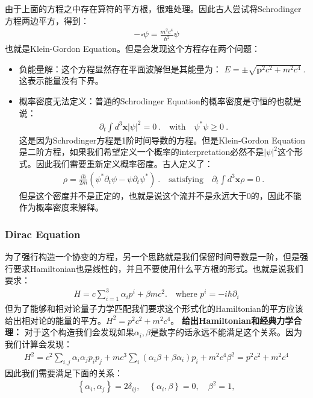 由于上面的方程之中存在算符的平方根，很难处理。因此古人尝试将Schrodinger方程两边平方，得到：
\begin{align}
  -\square\psi=\frac{m^2c^4}{\hbar^2}\psi
\end{align}
也就是Klein-Gordon Equation。但是会发现这个方程存在两个问题：
\begin{itemize}
  \item 负能量解：这个方程显然存在平面波解但是其能量为： $
    E=\pm\sqrt{\mathbf{p}^2c^2+m^2c^4}\mathrm{~.} $这表示能量没有下界。
  \item 概率密度无法定义：普通的Schrodinger Equation的概率密度是守恒的也就是说：
    \begin{align}
      \partial_{t} \int d^3\mathbf{x} |\psi|^2 = 0\mathrm{~.} \quad
      \text{with} \quad \psi^* \psi \geq 0\mathrm{~.}
    \end{align}
    这是因为Schrodinger方程是1阶时间导数的方程。但是Klein-Gordon
    Equation是二阶方程，如果我们希望定义一个概率的interpretation必然不是$ |\psi|^2
    $这个形式。因此我们需要重新定义概率密度。古人定义了：
    \begin{align}
      \rho = \frac{i\hbar}{2m}(\psi^*\partial_t\psi -
      \psi\partial_t\psi^*)\mathrm{~.} \quad \text{satisfying} \quad
      \partial_t \int d^3\mathbf{x} \rho = 0\mathrm{~.}
    \end{align}
    但是这个密度并不是正定的，也就是说这个流并不是永远大于0的，因此不能作为概率密度来解释。
\end{itemize}

\subsubsection{Dirac Equation}

\bigskip
{}

为了强行构造一个协变的方程，另一个思路就是我们保留时间导数是一阶，但是强行要求Hamiltonian也是线性的，并且不要使用什么平方根的形式。也就是说我们要求：
\begin{align}
  H=c\sum_{i=1}^3\alpha_ip^i+\beta mc^2. \quad \text{where }
  p^i=-i\hbar \partial_i
\end{align}
但为了能够和相对论量子力学匹配我们要求这个形式化的Hamiltonian的平方应该给出相对论的能量的平方。$ H^2 = p^2c^2 + m^2c^4 $。
\textbf{给出Hamiltonian和经典力学合理：}
对于这个构造我们会发现如果$ \alpha_i, \beta $是数字的话永远不能满足这个关系。因为我们计算会发现：
\begin{align}
  H^2 = c^2\sum_{i,j}\alpha_i\alpha_j p_ip_j +
  mc^3\sum_i(\alpha_i\beta+\beta\alpha_i)p_i + m^2c^4\beta^2 = p^2c^2 + m^2c^4
\end{align}
因此我们需要满足下面的关系：
\begin{align}
  \left\{\alpha_i,\alpha_j\right\}=2\delta_{ij},\quad\left\{\alpha_i,\beta\right\}=0,\quad\beta^2=1,
\end{align}

